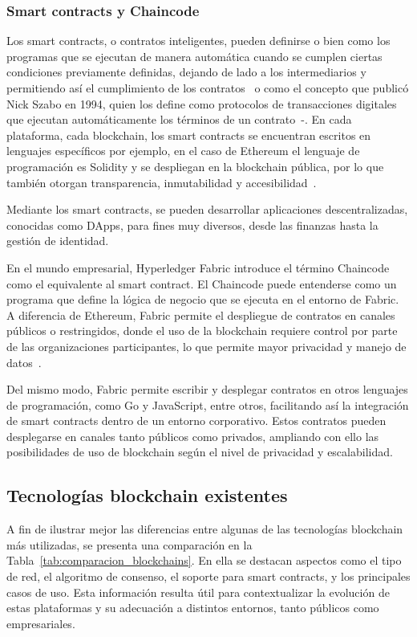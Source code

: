 \subsubsection{Smart contracts y Chaincode}
Los smart contracts, o contratos inteligentes, pueden definirse o bien como los programas que se ejecutan de manera automática cuando se cumplen ciertas condiciones previamente definidas, dejando de lado a los intermediarios y permitiendo así el cumplimiento de los contratos~\cite{Swan2015} o como el concepto que publicó Nick Szabo en 1994, quien los define como protocolos de transacciones digitales que ejecutan automáticamente los términos de un contrato~\cite{Szabo1996}-.
En cada plataforma, cada blockchain, los smart contracts se encuentran escritos en lenguajes específicos por ejemplo, en el caso de Ethereum el lenguaje de programación es Solidity y se despliegan en la blockchain pública, por lo que también otorgan transparencia, inmutabilidad y accesibilidad~\cite{EthereumWhitePaper}.

Mediante los smart contracts, se pueden desarrollar aplicaciones descentralizadas, conocidas como DApps, para fines muy diversos, desde las finanzas hasta la gestión de identidad.

En el mundo empresarial, Hyperledger Fabric introduce el término Chaincode como el equivalente al smart contract. El Chaincode puede entenderse como un programa que define la lógica de negocio que se ejecuta en el entorno de Fabric. A diferencia de Ethereum, Fabric permite el despliegue de contratos en canales públicos o restringidos, donde el uso de la blockchain requiere control por parte de las organizaciones participantes, lo que permite mayor privacidad y manejo de datos~\cite{HyperledgerFabricChaincode}.

Del mismo modo, Fabric permite escribir y desplegar contratos en otros lenguajes de programación, como Go y JavaScript, entre otros, facilitando así la integración de smart contracts dentro de un entorno corporativo. Estos contratos pueden desplegarse en canales tanto públicos como privados, ampliando con ello las posibilidades de uso de blockchain según el nivel de privacidad y escalabilidad.
\subsection{Tecnologías blockchain existentes}
A fin de ilustrar mejor las diferencias entre algunas de las tecnologías blockchain más utilizadas, se presenta una comparación en la Tabla~\ref{tab:comparacion_blockchains}. En ella se destacan aspectos como el tipo de red, el algoritmo de consenso, el soporte para smart contracts, y los principales casos de uso. Esta información resulta útil para contextualizar la evolución de estas plataformas y su adecuación a distintos entornos, tanto públicos como empresariales.


